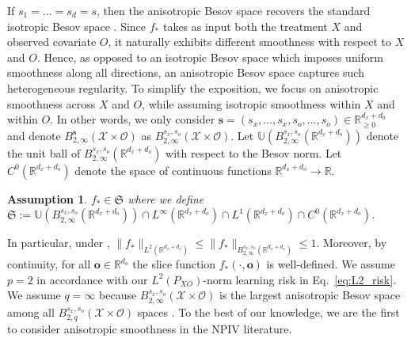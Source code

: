 \documentclass[11pt]{article}
\newcommand{\bo}{\mathbf o}
\newcommand{\calO}{\mathcal{O}}
\newcommand{\calX}{\mathcal{X}}
\newcommand{\R}{\mathbb{R}}
\newcommand{\0}{\mathbf{0}}
\newcommand{\bs}{\boldsymbol{s}}
\newtheorem{ass}{Assumption}[section]
\begin{document}
If $s_1 = \dots = s_d = s$, then the anisotropic Besov space recovers the standard isotropic Besov space \citep{devore1988interpolation, devore1993besov}. 
Since $f_\ast$ takes as input both the treatment $X$ and observed covariate $O$, it naturally exhibits different smoothness with respect to $X$ and $O$. 
Hence, as opposed to an isotropic Besov space which imposes uniform smoothness along all directions, an anisotropic Besov space captures such heterogeneous regularity. To simplify the exposition, we focus on anisotropic smoothness across $X$ and $O$, while assuming isotropic smoothness within $X$ and within $O$. 
In other words, we only consider $\bs=(s_x,\dots,s_x, s_o,\dots,s_o) \in \R_{\geq 0}^{d_x+d_0}$ and denote $B^{\bs}_{2,\infty}(\calX\times\calO)$ as $B^{s_x, s_o}_{2,\infty}(\calX\times\calO)$. Let $\mathbb{U}(B^{s_x,s_o}_{2,\infty}(\mathbb{R}^{d_x+d_o}))$ denote the unit ball of $B^{s_x,s_o}_{2,\infty}(\mathbb{R}^{d_x+d_o})$ with respect to the Besov norm. Let $C^{0}(\mathbb{R}^{d_x+d_o})$ denote the space of continuous functions $\mathbb{R}^{d_x+d_o}\to \mathbb{R}$. 
\begin{ass}
\label{ass:f_ast}
$f_{\ast}\in \mathfrak{S}$ where we define $\mathfrak{S} :=  \mathbb{U}(B^{s_x,s_o}_{2,\infty}(\mathbb{R}^{d_x+d_o}))\cap L^{\infty}(\mathbb{R}^{d_x+d_o}) \cap L^1(\mathbb{R}^{d_x+d_o})\cap C^{0}(\mathbb{R}^{d_x+d_o})$.  
\end{ass}
In particular, under , $\|f_{\ast}\|_{L^2(\mathbb{R}^{d_x+d_o})} \leq \|f_{\ast}\|_{B^{s_x,s_o}_{2,\infty}(\mathbb{R}^{d_x+d_o})}\leq 1$. Moreover, by continuity, for all $\bo\in \mathbb{R}^{d_o}$ the slice function $f_{\ast}(\cdot, \bo)$ is well-defined. We assume $p=2$ in accordance with our $L^2(P_{XO})$-norm learning risk in Eq.~\eqref{eq:L2_risk}. 
We assume $q=\infty$ because $B^{s_x, s_o}_{2,\infty}(\calX\times\calO)$ is the largest anisotropic Besov space among all $B^{s_x, s_o}_{2,q}(\calX\times\calO)$ spaces \citep{triebel2011entropy}. 
To the best of our knowledge, we are the first to consider anisotropic smoothness in the NPIV literature.
\end{document}
